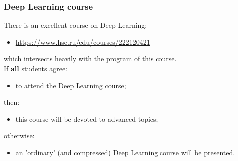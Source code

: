 \documentclass[mathserif, aspectratio=43]{beamer}
\begin{document}
\begin{frame}[fragile]
\frametitle{Deep Learning course}
There is an excellent course on Deep Learning:
\begin{itemize}
\item \url{https://www.hse.ru/edu/courses/222120421}
\end{itemize}
which intersects heavily with the program of this course.\\[5mm]
If \textbf{all} students agree:
\begin{itemize}
\item to attend the Deep Learning course;
\end{itemize}
then:
\begin{itemize}
\item this course will be devoted to advanced topics;
\end{itemize}
otherwise:
\begin{itemize}
\item an 'ordinary' (and compressed) Deep Learning course will be presented.
\end{itemize}

\end{frame}
\end{document}

